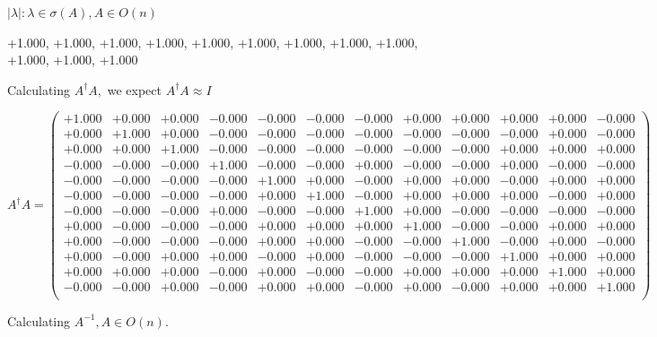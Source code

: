 \documentclass[9pt]{article}
\theoremstyle{plain}
\theoremstyle{definition}
\theoremstyle{remark}
\numberwithin{equation}{section}
\begin{document}
 $|\lambda | : \lambda \in \sigma(A) , A \in O(n)$

+1.000, +1.000, +1.000, +1.000, +1.000, +1.000, +1.000, +1.000, +1.000, +1.000, +1.000, +1.000


Calculating $A^{\dag} A,$  we expect $A^{\dag} A \approx I$

$A^{\dag} A = \left(
\begin{array}{
cccccccccccc}
+1.000 & +0.000 & +0.000 & -0.000 & -0.000 & -0.000 & -0.000 & +0.000 & +0.000 & +0.000 & +0.000 & -0.000 \\
+0.000 & +1.000 & +0.000 & -0.000 & -0.000 & -0.000 & -0.000 & -0.000 & -0.000 & -0.000 & +0.000 & -0.000 \\
+0.000 & +0.000 & +1.000 & -0.000 & -0.000 & -0.000 & -0.000 & -0.000 & -0.000 & +0.000 & +0.000 & +0.000 \\
-0.000 & -0.000 & -0.000 & +1.000 & -0.000 & -0.000 & +0.000 & -0.000 & -0.000 & +0.000 & -0.000 & -0.000 \\
-0.000 & -0.000 & -0.000 & -0.000 & +1.000 & +0.000 & -0.000 & +0.000 & +0.000 & -0.000 & +0.000 & +0.000 \\
-0.000 & -0.000 & -0.000 & -0.000 & +0.000 & +1.000 & -0.000 & +0.000 & +0.000 & +0.000 & -0.000 & +0.000 \\
-0.000 & -0.000 & -0.000 & +0.000 & -0.000 & -0.000 & +1.000 & +0.000 & -0.000 & -0.000 & -0.000 & -0.000 \\
+0.000 & -0.000 & -0.000 & -0.000 & +0.000 & +0.000 & +0.000 & +1.000 & -0.000 & -0.000 & +0.000 & +0.000 \\
+0.000 & -0.000 & -0.000 & -0.000 & +0.000 & +0.000 & -0.000 & -0.000 & +1.000 & -0.000 & +0.000 & -0.000 \\
+0.000 & -0.000 & +0.000 & +0.000 & -0.000 & +0.000 & -0.000 & -0.000 & -0.000 & +1.000 & +0.000 & +0.000 \\
+0.000 & +0.000 & +0.000 & -0.000 & +0.000 & -0.000 & -0.000 & +0.000 & +0.000 & +0.000 & +1.000 & +0.000 \\
-0.000 & -0.000 & +0.000 & -0.000 & +0.000 & +0.000 & -0.000 & +0.000 & -0.000 & +0.000 & +0.000 & +1.000 \\
\end{array}
\right)$ \newline 

Calculating $A^{-1} ,  A \in O(n)$.
\end{document}
